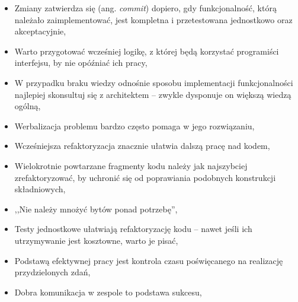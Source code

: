\begin{description}
\begin{itemize}
\item Zmiany zatwierdza się (ang. \emph{commit}) dopiero, gdy funkcjonalność, którą należało zaimplementować, jest kompletna i przetestowana jednostkowo oraz akceptacyjnie,
\item Warto przygotować wcześniej logikę, z której będą korzystać programiści interfejsu, by nie opóźniać ich pracy,
\item W przypadku braku wiedzy odnośnie sposobu implementacji funkcjonalności najlepiej skonsultuj się z architektem -- zwykle dysponuje on większą wiedzą ogólną,
\item Werbalizacja problemu bardzo często pomaga w jego rozwiązaniu,
\item Wcześniejsza refaktoryzacja znacznie ułatwia dalszą pracę nad kodem,
\item Wielokrotnie powtarzane fragmenty kodu należy jak najszybciej zrefaktoryzować, by uchronić się od poprawiania podobnych konstrukcji składniowych,
\item ,,Nie należy mnożyć bytów ponad potrzebę'',
\item Testy jednostkowe ułatwiają refaktoryzację kodu -- nawet jeśli ich utrzymywanie jest kosztowne, warto je pisać,
\item Podstawą efektywnej pracy jest kontrola czasu poświęcanego na realizację przydzielonych zdań,
\item Dobra komunikacja w zespole to podstawa sukcesu,
\end{itemize}
\end{description}
